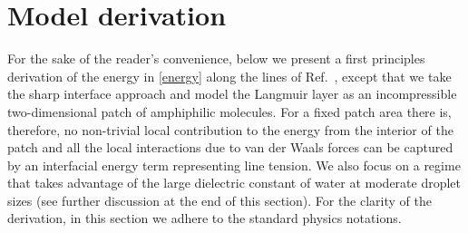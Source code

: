 \documentclass[11pt]{article}
\numberwithin{statement}{section}
\numberwithin{equation}{section}
\theoremstyle{remark}
\begin{document}
\appendix

\section{Model derivation}
\label{sec:model-derivation}

For the sake of the reader's convenience, below we present a first
principles derivation of the energy in \eqref{energy} along the lines
of Ref.\ \cite{andelman87}, except that we take the sharp interface
approach and model the Langmuir layer as an incompressible
two-dimensional patch of amphiphilic molecules. For a fixed patch area
there is, therefore, no non-trivial local contribution to the energy
from the interior of the patch and all the local interactions due to
van der Waals forces can be captured by an interfacial energy term
representing line tension. We also focus on a regime that takes
advantage of the large dielectric constant of water at moderate
droplet sizes (see further discussion at the end of this section). For
the clarity of the derivation, in this section we adhere to the
standard physics notations.
\end{document}
